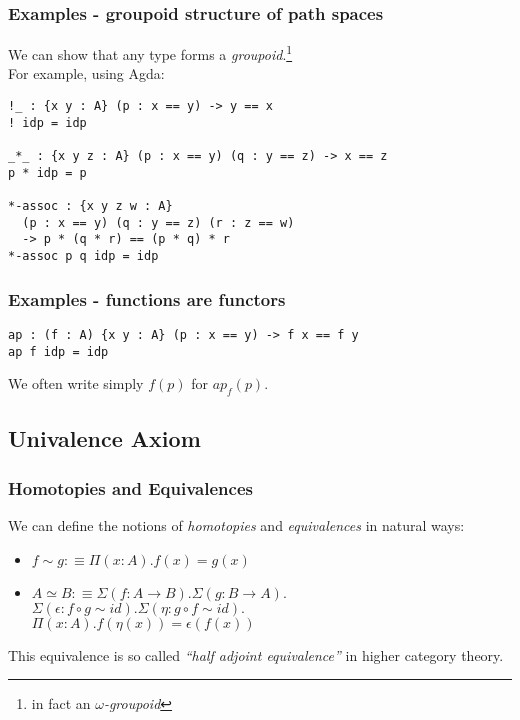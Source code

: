 \documentclass[dvipdfmx]{beamer}
\begin{document}
\begin{frame}[containsverbatim]
  \frametitle{Examples - groupoid structure of path spaces}
  We can show that any type forms a {\it groupoid}.\footnote{
    in fact an {\it $\omega$-groupoid}}
  \\
  For example, using Agda:

  \begin{verbatim}
!_ : {x y : A} (p : x == y) -> y == x
! idp = idp

_*_ : {x y z : A} (p : x == y) (q : y == z) -> x == z
p * idp = p

*-assoc : {x y z w : A}
  (p : x == y) (q : y == z) (r : z == w)
  -> p * (q * r) == (p * q) * r
*-assoc p q idp = idp
  \end{verbatim}
\end{frame}

\begin{frame}[containsverbatim]
  \frametitle{Examples - functions are functors}
  \begin{verbatim}
ap : (f : A) {x y : A} (p : x == y) -> f x == f y
ap f idp = idp
  \end{verbatim}
  We often write simply
  $f \left( p \right)$
  for $ap_f \left( p \right)$.
\end{frame}

\subsection{Univalence Axiom}

\begin{frame}
  \frametitle{Homotopies and Equivalences}
  We can define the notions of {\it homotopies} and {\it equivalences}
  in natural ways:
  \begin{itemize}
    \item
    $f \sim g :\equiv \Pi \left( x : A \right) .
    f \left( x \right) = g \left( x \right)$
    \item
    $A \simeq B :\equiv \Sigma \left( f : A \to B \right) .
    \Sigma \left( g : B \to A \right) .$ \\
    $\Sigma \left( \epsilon : f \circ g \sim id \right) .
    \Sigma \left( \eta : g \circ f \sim id \right) .$ \\
    $\Pi \left( x : A \right) .
    f \left( \eta \left( x \right) \right) = \epsilon \left( f \left( x \right) \right)$
  \end{itemize}
  This equivalence is so called {\it ``half adjoint equivalence''}
  in higher category theory.
\end{frame}
\end{document}
